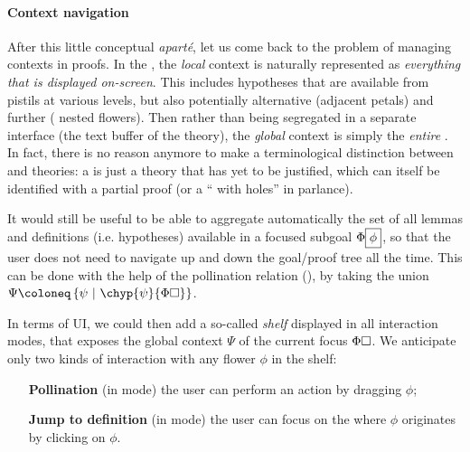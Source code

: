 \begin{scope}
\paragraph{Context navigation}

After this little conceptual \textit{aparté}, let us come back to the problem of
managing contexts in proofs. In the , the \emph{local} context is
naturally represented as \emph{everything that is displayed on-screen}. This
includes hypotheses that are available from pistils at various levels, but also
potentially alternative  (adjacent petals) and further  (
nested flowers). Then rather than being segregated in a separate interface (the
text buffer of the theory), the \emph{global} context is simply the
\emph{entire} . In fact, there is no reason anymore to make a terminological
distinction between  and theories: a  is just a theory that has yet to
be justified, which can itself be identified with a partial proof (or a `` with holes'' in  parlance).

It would still be useful to be able to aggregate automatically the set of all
lemmas and definitions (i.e. hypotheses) available in a focused subgoal
$\Phi\fbox{$\phi$}$, so that the user does not need to navigate up and down the
goal/proof tree all the time. This can be done with the help of the pollination
relation (), by taking the union $\Psi \deq
\compr{\psi}{\chyp{\psi}{\Phi\hole}}$.

In terms of UI, we could then add a so-called \emph{shelf} displayed in all
interaction modes, that exposes the global context $\Psi$ of the current focus
$\Phi\square$. We anticipate only two kinds of interaction with any flower $\phi$
in the shelf:
\begin{itemize}
  \item[\textbf{Pollination} (in \Proof mode)] the user can perform an
   action by dragging $\phi$;
  \item[\textbf{Jump to definition} (in \Navigation mode)] the user can focus on
  the  where $\phi$ originates by clicking on $\phi$.
\end{itemize}


\end{scope}
